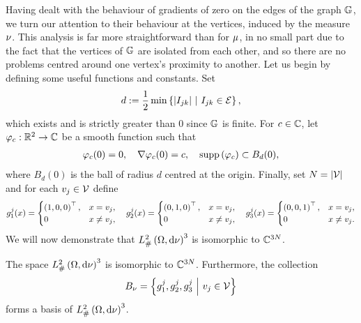 Having dealt with the behaviour of gradients of zero on the edges of the graph $\mathbb{G}$, we turn our attention to their behaviour at the vertices, induced by the measure $\nu$.
This analysis is far more straightforward than for $\mu$, in no small part due to the fact that the vertices of $\mathbb{G}$ are isolated from each other, and so there are no problems centred around one vertex's proximity to another.
Let us begin by defining some useful functions and constants.
Set 
\begin{align} \label{eq:HalfMinDistBetweenVertsDef}
	d := \frac{1}{2}\min\left\{ \left\lvert I_{jk} \right\rvert \ \middle\vert \  I_{jk}\in\mathcal{E} \right\},
\end{align}
which exists and is strictly greater than 0 since $\mathbb{G}$ is finite.
For $c\in\mathbb{C}$, let $\varphi_c:\mathbb{R}^2\rightarrow\mathbb{C}$ be a smooth function such that
\begin{align} \label{eq:NuSmoothVertexFunctionDef}
	\varphi_c(0) = 0, \quad
	\nabla\varphi_c(0) = c, \quad
	\mathrm{supp}\left( \varphi_c \right)\subset B_d(0),
\end{align}
where $B_d(0)$ is the ball of radius $d$ centred at the origin.
Finally, set $N = \left\lvert \mathcal{V} \right\rvert$ and for each $v_j\in\mathcal{V}$ define
\begin{align*}
	g_1^j(x) = \begin{cases} \left( 1,0,0 \right)^\top, & x=v_j, \\ 0 & x\neq v_j, \end{cases}
	\quad
	g_2^j(x) = \begin{cases} \left( 0,1,0 \right)^\top, & x=v_j, \\ 0 & x\neq v_j, \end{cases}
	\quad
	g_3^j(x) = \begin{cases} \left( 0,0,1 \right)^\top, & x=v_j, \\ 0 & x\neq v_j. \end{cases}
\end{align*}
We will now demonstrate that $L^2_{\#}\left( \Omega,\mathrm{d} \nu \right)^3$ is isomorphic to $\mathbb{C}^{3N}$. 
\begin{lemma} \label{lem:L2nuIsomCN}
	The space $L^2_{\#}\left( \Omega,\mathrm{d} \nu \right)^3$ is isomorphic to $\mathbb{C}^{3N}$.
	Furthermore, the collection 
	\begin{align*}
		B_{\nu} = \left\{ g_1^j, g_2^j, g_3^j \ \middle\vert \  v_j\in\mathcal{V} \right\}
	\end{align*} forms a basis of $L^2_{\#}\left( \Omega,\mathrm{d} \nu \right)^3$.
\end{lemma}
